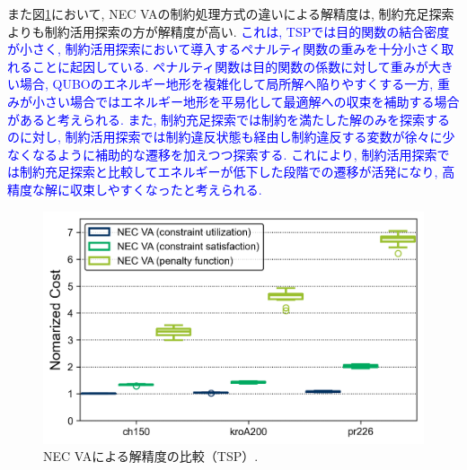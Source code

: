 \documentclass[submit,techrep,noauthor]{ipsj}
\begin{document}
また図\ref{Cost_TSP_VA}において, NEC VAの制約処理方式の違いによる解精度は, 制約充足探索よりも制約活用探索の方が解精度が高い. \textcolor{blue}{これは, TSPでは目的関数の結合密度が小さく, 制約活用探索において導入するペナルティ関数の重みを十分小さく取れることに起因している. ペナルティ関数は目的関数の係数に対して重みが大きい場合, QUBOのエネルギー地形を複雑化して局所解へ陥りやすくする一方, 重みが小さい場合ではエネルギー地形を平易化して最適解への収束を補助する場合があると考えられる. また, 制約充足探索では制約を満たした解のみを探索するのに対し, 制約活用探索では制約違反状態も経由し制約違反する変数が徐々に少なくなるように補助的な遷移を加えつつ探索する. これにより, 制約活用探索では制約充足探索と比較してエネルギーが低下した段階での遷移が活発になり, 高精度な解に収束しやすくなったと考えられる.}


\begin{figure}[tb]
\centering
\includegraphics[bb=0 0 700 230, width=15cm]{Cost_TSP_VA.png}
\caption{NEC VAによる解精度の比較（TSP）.}
\label{Cost_TSP_VA}
\end{figure}
\end{document}
